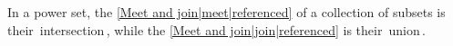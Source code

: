 

In a power set, the \ref{Meet and join|meet|referenced} of a collection of subsets is their \,intersection\,, while the \ref{Meet and join|join|referenced} is their \,union\,.